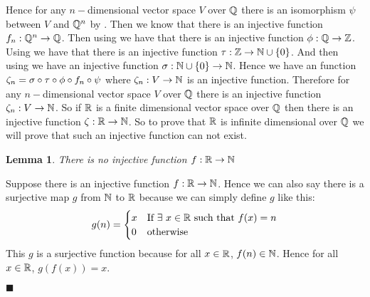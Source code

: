 \documentclass[a4paper, 11pt]{article}
\newtheorem{lemma}{Lemma}
\renewenvironment{proof}{\noindent{\it \textbf{Proof:}}\hspace*{1em}}{\hfill $\blacksquare$\bigskip\\}
\begin{document}
{\begin{itemize}
Hence for any $n-$dimensional vector space $V$ over $\mathbb{Q}$ there is an isomorphism $\psi$ between $V$ and $\mathbb{Q}^n$ by . Then we know that there is an injective function $f_n:\mathbb{Q}^n\to\mathbb{Q}$. Then using  we have that there is an injective function $\phi:\mathbb{Q}\to \mathbb{Z}$. Using  we have that  there is an injective function $\tau:\mathbb{Z}\to\mathbb{N}\cup\{0\}$. And then using  we have an injective function $\sigma:\mathbb{N}\cup\{0\}\to \mathbb{N}$. Hence we have an  function $\zeta_n=\sigma\circ\tau\circ\phi\circ f_n\circ \psi$ where $\zeta_n:V\to \mathbb{N}$ is an injective function. Therefore for any $n-$dimensional vector space $V$ over $\mathbb{Q}$ there is an injective function $\zeta_n:V\to \mathbb{N}$.  So if $\mathbb{R}$ is a finite dimensional vector space over $\mathbb{Q}$ then there is an injective function $\zeta:\mathbb{R}\to\mathbb{N}$.  So to prove that $\mathbb{R}$ is infinite dimensional over $\mathbb{Q}$ we will prove that such an injective function can not exist.
\begin{lemma}
	There is no injective function $f:\mathbb{R}\to\mathbb{N}$
\end{lemma}
\begin{proof}
	Suppose  there is an injective function $f:\mathbb{R}\to\mathbb{N}$. Hence we can also say there is a surjective map $g$ from $\mathbb{N}$ to $\mathbb{R}$ because we can simply define $g$ like this: $$g(n)=\begin{cases}
		x& \text{If $\exists\ x\in\mathbb{R}$ such that $f(x)=n$}\\
		0 & \text{otherwise}
	\end{cases}$$This $g$ is a surjective function because for all $x\in\mathbb{R}$, $f(n)\in\mathbb{N}$. Hence for all $x\in \mathbb{R}$, $g(f(x))=x$. 


\end{proof}
\end{itemize}}
\end{document}
